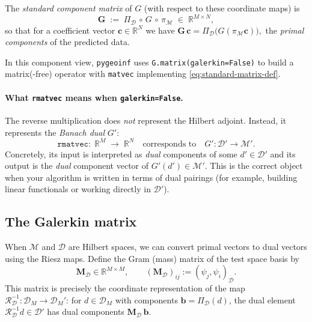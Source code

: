 \documentclass[11pt,twoside,openright]{book}
\theoremstyle{plain}
\theoremstyle{definition}
\theoremstyle{remark}
\newcommand{\modelspace}{\mathcal{M}}
\newcommand{\dataspace}{\mathcal{D}}
\newcommand{\Gd}{\mathbf{G}}              %
\newcommand{\mass}{\mathbf{M}}             %
\newcommand{\ipD}[2]{(#1,#2)_{\dataspace}}
\newcommand{\Riesz}{\mathcal{R}}
\begin{document}
The \emph{standard component matrix} of $G$ (with respect to these coordinate
maps) is
\begin{equation}
  \label{eq:standard-matrix-def}
  \Gd \;:=\; \Pi_{\dataspace}\,\circ\, G\,\circ\,\pi_{\modelspace}
  \;\in\; \mathbb{R}^{M\times N},
\end{equation}
so that for a coefficient vector $\mathbf{c}\in\mathbb{R}^N$ we have
\(
  \Gd\,\mathbf{c} = \Pi_{\dataspace}\bigl(G(\pi_{\modelspace}\mathbf{c})\bigr),
\)
the \emph{primal components} of the predicted data.

In this component view, \texttt{pygeoinf} uses
\texttt{G.matrix(galerkin=False)} to build a matrix(-free) operator with
\texttt{matvec} implementing \eqref{eq:standard-matrix-def}.

\paragraph{What \texttt{rmatvec} means when \texttt{galerkin=False}.}
The reverse multiplication does \emph{not} represent the Hilbert adjoint.
Instead, it represents the \emph{Banach dual} $G'$:
\begin{equation}
  \label{eq:standard-rmatvec-dual}
  \texttt{rmatvec}:\; \mathbb{R}^M \;\longrightarrow\; \mathbb{R}^N
  \quad\text{corresponds to}\quad
  G' : \dataspace' \to \modelspace'.
\end{equation}
Concretely, its input is interpreted as \emph{dual} components of some
$d'\in\dataspace'$ and its output is the \emph{dual} component vector of
$G'(d')\in\modelspace'$. This is the correct object when your algorithm is
written in terms of dual pairings (for example, building linear functionals or
working directly in $\dataspace'$).

\subsection{The Galerkin matrix}
\label{ssec:galerkin-matrix}

When $\modelspace$ and $\dataspace$ are Hilbert spaces, we can convert primal
vectors to dual vectors using the Riesz maps. Define the Gram (mass) matrix of
the test space basis by
\begin{equation}
  \label{eq:mass-matrix-data}
  \mass_{\dataspace} \in \mathbb{R}^{M\times M},
  \qquad
  (\mass_{\dataspace})_{ij} := \ipD{\psi_j}{\psi_i}.
\end{equation}
This matrix is precisely the coordinate representation of the map
$\Riesz_{\dataspace}^{-1}:\dataspace_M\to\dataspace_M'$: for
$d\in\dataspace_M$ with components $\mathbf{b}=\Pi_{\dataspace}(d)$,
the dual element $\Riesz_{\dataspace}^{-1}d\in\dataspace'$ has dual components
$\mass_{\dataspace}\,\mathbf{b}$.
\end{document}
